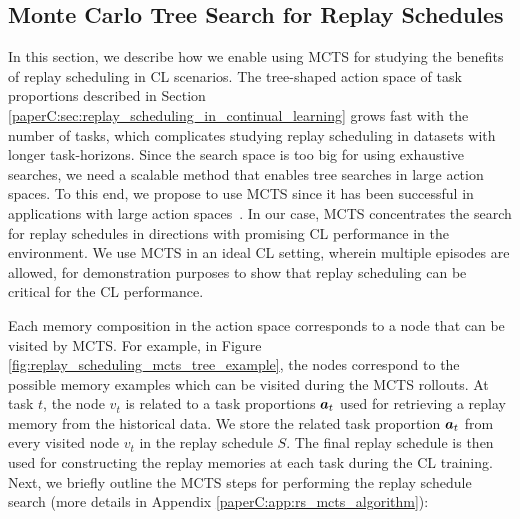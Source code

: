 
\subsection{Monte Carlo Tree Search for Replay Schedules}
\label{paperC:sec:mcts_for_replay_scheduling}

In this section, we describe how we enable using MCTS for studying the benefits of replay scheduling in CL scenarios.
The tree-shaped action space of task proportions described in Section \ref{paperC:sec:replay_scheduling_in_continual_learning} grows fast with the number of tasks, which complicates studying replay scheduling in datasets with longer task-horizons. Since the search space is too big for using exhaustive searches, 
we need a scalable method that enables tree searches in large action spaces.
To this end, we propose to use MCTS since it has been successful in applications with large action spaces~. In our case, MCTS concentrates the search for replay schedules in directions with promising CL performance in the environment. We use MCTS in an ideal CL setting, wherein multiple episodes are allowed, for demonstration purposes to show that replay scheduling can be critical for the CL performance. 

Each memory composition in the action space corresponds to a node that can be visited by MCTS. For example, in Figure \ref{fig:replay_scheduling_mcts_tree_example}, the nodes correspond to the possible memory examples which can be visited during the MCTS rollouts.
At task $t$, the node $v_t$ is related to a task proportions ${\bm{a}}_{t}$ used for retrieving a replay memory from the historical data. 
We store the related task proportion ${\bm{a}}_t$ from every visited node $v_t$ in the replay schedule $S$. 
The final replay schedule is then used for constructing the replay memories at each task during the CL training.  
Next, we briefly outline the MCTS steps for performing the replay schedule search (more details in Appendix \ref{paperC:app:rs_mcts_algorithm}):

